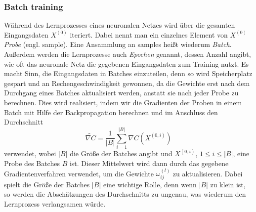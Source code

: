 \subsubsection{Batch training}
Während des Lernprozesses eines neuronalen Netzes wird über die gesamten Eingangsdaten $X^{(0)}$ iteriert. Dabei nennt
man ein einzelnes Element von $X^{(0)}$ \textit{Probe} (engl. sample). Eine Ansammlung an samples heißt wiederum
\textit{Batch}. Außerdem werden die Lernprozesse auch \textit{Epochen} genannt, dessen Anzahl angibt, wie oft das
neuronale Netz die gegebenen Eingangsdaten zum Training nutzt. Es macht Sinn, die Eingangsdaten in Batches einzuteilen,
denn so wird Speicherplatz gespart und an Rechengeschwindigkeit gewonnen, da die Gewichte erst nach dem Durchgang eines
Batches aktualisiert werden, anstatt sie nach jeder Probe zu berechnen. Dies wird realisiert, indem wir die Gradienten
der Proben in einem Batch mit Hilfe der Backpropagation berechnen und im Anschluss den Durchschnitt
\[
    \widetilde{\nabla C} = \frac{1}{|B|} \sum_{i=1}^{|B|} \nabla C(X^{(0,i)})
\]
verwendet, wobei $|B|$ die Größe der Batches angibt und $X^{(0,i)}$, $1 \leq i \leq |B|$, eine Probe des Batches $B$ ist.
Dieser Mittelwert wird dann durch das gegebene Gradientenverfahren verwendet, um die Gewichte $\omega_{ij}^{(l)}$ zu
aktualisieren. Dabei spielt die Größe der Batches $|B|$ eine wichtige Rolle, denn wenn $|B|$ zu klein ist, so werden die
Abschätzungen des Durchschnitts zu ungenau, was wiederum den Lernprozess verlangsamen würde.

